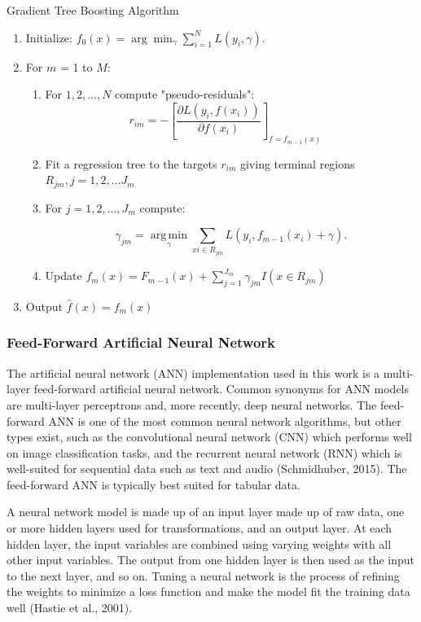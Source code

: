 \documentclass[conference,final,]{IEEEtran}
\begin{document}
\begin{algorithm}
\caption{Gradient Tree Boosting Algorithm}\label{alg:GBMAlo}
\begin{enumerate}
\item Initialize: $f_0(x) = \arg\min_\gamma \sum_{i=1}^N L(y_i, \gamma).$
\item For $m$ = 1 to $M$:
\begin{enumerate}
\item For $1,2,...,N$ compute "pseudo-residuals":
$$
r_{im} = -\left[\frac{\partial L(y_i, f(x_i))}{\partial f(x_i)}\right]_{f=f_{m-1}(x)} \quad
$$
\item Fit a regression tree to the targets $r_{im}$ giving terminal regions $R_{jm}, j = 1,2,...J_m$
\item For $j = 1,2,...,J_m$ compute:

$$
\gamma_{jm} = \underset{\gamma}{\operatorname{arg\,min}} \sum_{xi \in R_{jm}} L\left(y_i, f_{m-1}(x_i) + \gamma \right).
$$
\item Update $f_m(x) = F_{m-1}(x) + \sum_{j=1}^{J_m}\gamma_{jm}I(x \in R_{jm})$
\end{enumerate}
\item Output $\hat{f}(x) = f_m(x)$
\end{enumerate}
\end{algorithm}

\hypertarget{feed-forward-artificial-neural-network}{%
\subsubsection{Feed-Forward Artificial Neural
Network}\label{feed-forward-artificial-neural-network}}

The artificial neural network (ANN) implementation used in this work is
a multi-layer feed-forward artificial neural network. Common synonyms
for ANN models are multi-layer perceptrons and, more recently, deep
neural networks. The feed-forward ANN is one of the most common neural
network algorithms, but other types exist, such as the convolutional
neural network (CNN) which performs well on image classification tasks,
and the recurrent neural network (RNN) which is well-suited for
sequential data such as text and audio (Schmidhuber, 2015). The
feed-forward ANN is typically best suited for tabular data.

A neural network model is made up of an input layer made up of raw data,
one or more hidden layers used for transformations, and an output layer.
At each hidden layer, the input variables are combined using varying
weights with all other input variables. The output from one hidden layer
is then used as the input to the next layer, and so on. Tuning a neural
network is the process of refining the weights to minimize a loss
function and make the model fit the training data well (Hastie et al.,
2001).
\end{document}
